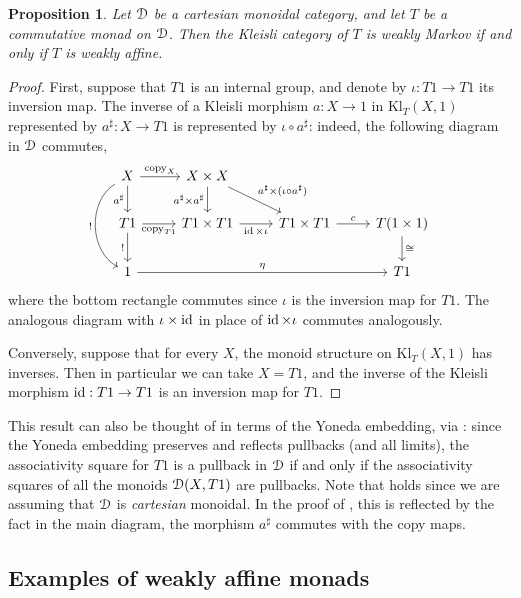 \documentclass[a4paper,UKenglish,numberwithinsect,cleveref, autoref, thm-restate]{lipics-v2021}
\theoremstyle{plain} %
\newtheorem{myproposition}[mytheorem]{Proposition}
\theoremstyle{definition} %
\begin{document}
\begin{myproposition}\label{weaklyboth}
 Let $\mathcal{D}$ be a cartesian monoidal category, and let $T$ be a commutative monad on $\mathcal{D}$. Then the Kleisli category of $T$ is weakly Markov if and only if $T$ is weakly affine.
\end{myproposition}
\begin{proof}
 First, suppose that $T1$ is an internal group, and denote by $\iota:T1\to T1$ its inversion map. 
 The inverse of a Kleisli morphism $a : X \to 1$ in $\mathrm{Kl}_T(X,1)$ represented by $a^\sharp:X\to T1$ is represented by $\iota\circ a^\sharp$: indeed, the following diagram in $\mathcal{D}$ commutes,
 \[
  \begin{tikzcd}
  X \ar[bend right=5pc]{dd}[swap]{!} \ar{d}[swap]{a^\sharp} \ar{r}{\mathrm{copy}_X} & X\times X \ar{d}[swap]{a^\sharp\times a^\sharp} \ar{dr}{a^\sharp\times(\iota\circ a^\sharp)} \\
  T1 \ar{d}[swap]{!} \ar{r}[swap]{\mathrm{copy}_{T1}} & T1\times T1 \ar{r}[swap]{\id\times\iota} & T1\times T1 \ar{r}{c} & T(1\times 1) \ar{d}{\cong} \\
  1 \ar{rrr}{\eta} &&& T1
  \end{tikzcd}
 \]
 where the bottom rectangle commutes since $\iota$ is the inversion map for $T1$. The analogous diagram with $\iota\times\operatorname{ id}$ in place of $\operatorname{ id}\times\iota$ commutes analogously.
 
 Conversely, suppose that for every $X$, the monoid structure on $\mathrm{Kl}_T(X,1)$ has inverses. Then in particular we can take $X=T1$, and the inverse of the Kleisli morphism $\operatorname{ id}:T1\to T1$ is an inversion map for $T1$. 
\end{proof}

This result can also be thought of in terms of the Yoneda embedding, via : since the Yoneda embedding preserves and reflects pullbacks (and all limits), the associativity square for $T1$ is a pullback in $\mathcal{D}$ if and only if the associativity squares of all the monoids $\mathcal{D}(X,T1)$ are pullbacks.
Note that  holds since we are assuming that $\mathcal{D}$ is \emph{cartesian} monoidal. In the proof of , this is reflected by the fact in the main diagram, the morphism $a^\sharp$ commutes with the copy maps. 


\subsection{Examples of weakly affine monads} 
\end{document}
